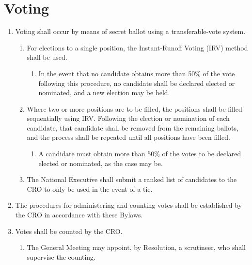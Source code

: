 \section{Voting}
\label{voting}

\begin{enumerate}
 \item Voting shall occur by means of secret ballot using a transferable-vote system.
  \begin{enumerate}
   \item For elections to a single position, the Instant-Runoff Voting (IRV) method shall be used.
    \begin{enumerate}
     \item In the event that no candidate obtains more than 50\% of the vote following this procedure, no candidate shall be declared elected or nominated, and a new election may be held.
    \end{enumerate}
   \item Where two or more positions are to be filled, the positions shall be filled sequentially using IRV. Following the election or nomination of each candidate, that candidate shall be removed from the remaining ballots, and the process shall be repeated until all positions have been filled.
    \begin{enumerate}
     \item A candidate must obtain more than 50\% of the votes to be declared elected or nominated, as the case may be.
    \end{enumerate}
   \item The National Executive shall submit a ranked list of candidates to the CRO to only be used in the event of a tie.
  \end{enumerate}
 \item The procedures for administering and counting votes shall be established by the CRO in accordance with these Bylaws.
 \item Votes shall be counted by the CRO.
  \begin{enumerate}
   \item The General Meeting may appoint, by Resolution, a scrutineer, who shall supervise the counting.
  \end{enumerate}
\end{enumerate}
